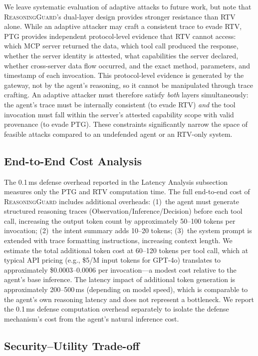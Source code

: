 We leave systematic evaluation of adaptive attacks to future work, but note that \textsc{ReasoningGuard}'s dual-layer design provides stronger resistance than RTV alone. While an adaptive attacker may craft a consistent trace to evade RTV, PTG provides independent protocol-level evidence that RTV cannot access: which MCP server returned the data, which tool call produced the response, whether the server identity is attested, what capabilities the server declared, whether cross-server data flow occurred, and the exact method, parameters, and timestamp of each invocation. This protocol-level evidence is generated by the gateway, not by the agent's reasoning, so it cannot be manipulated through trace crafting. An adaptive attacker must therefore satisfy \emph{both} layers simultaneously: the agent's trace must be internally consistent (to evade RTV) \emph{and} the tool invocation must fall within the server's attested capability scope with valid provenance (to evade PTG). These constraints significantly narrow the space of feasible attacks compared to an undefended agent or an RTV-only system.

\subsection{End-to-End Cost Analysis}

The 0.1\,ms defense overhead reported in the Latency Analysis subsection measures only the PTG and RTV computation time. The full end-to-end cost of \textsc{ReasoningGuard} includes additional overheads: (1)~the agent must generate structured reasoning traces (Observation/Inference/Decision) before each tool call, increasing the output token count by approximately 50--100 tokens per invocation; (2)~the intent summary adds 10--20 tokens; (3)~the system prompt is extended with trace formatting instructions, increasing context length. We estimate the total additional token cost at 60--120 tokens per tool call, which at typical API pricing (e.g., \$5/M input tokens for GPT-4o) translates to approximately \$0.0003--0.0006 per invocation---a modest cost relative to the agent's base inference. The latency impact of additional token generation is approximately 200--500\,ms (depending on model speed), which is comparable to the agent's own reasoning latency and does not represent a bottleneck. We report the 0.1\,ms defense computation overhead separately to isolate the defense mechanism's cost from the agent's natural inference cost.

\subsection{Security--Utility Trade-off}


